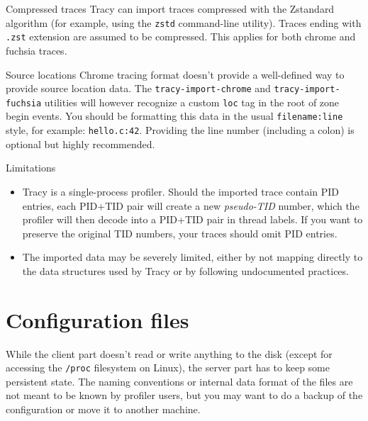\documentclass[hidelinks,titlepage,a4paper,twoside]{article}
\begin{document}
\begin{bclogo}[
noborder=true,
couleur=black!5,
logo=\bclampe
]{Compressed traces}
Tracy can import traces compressed with the Zstandard algorithm (for example, using the \texttt{zstd} command-line utility). Traces ending with \texttt{.zst} extension are assumed to be compressed.
This applies for both chrome and fuchsia traces.
\end{bclogo}

\begin{bclogo}[
noborder=true,
couleur=black!5,
logo=\bclampe
]{Source locations}
Chrome tracing format doesn't provide a well-defined way to provide source location data.
  The \texttt{tracy-import-chrome} and \texttt{tracy-import-fuchsia} utilities will however recognize a custom \texttt{loc} tag in the root of zone begin events. You should be formatting this data in the usual \texttt{filename:line} style, for example: \texttt{hello.c:42}. Providing the line number (including a colon) is optional but highly recommended.
\end{bclogo}

\begin{bclogo}[
noborder=true,
couleur=black!5,
logo=\bcattention
]{Limitations}
\begin{itemize}
\item Tracy is a single-process profiler. Should the imported trace contain PID entries, each PID+TID pair will create a new \emph{pseudo-TID} number, which the profiler will then decode into a PID+TID pair in thread labels. If you want to preserve the original TID numbers, your traces should omit PID entries.
\item The imported data may be severely limited, either by not mapping directly to the data structures used by Tracy or by following undocumented practices.
\end{itemize}
\end{bclogo}

\section{Configuration files}
\label{configurationfiles}

While the client part doesn't read or write anything to the disk (except for accessing the \texttt{/proc} filesystem on Linux), the server part has to keep some persistent state. The naming conventions or internal data format of the files are not meant to be known by profiler users, but you may want to do a backup of the configuration or move it to another machine.
\end{document}
